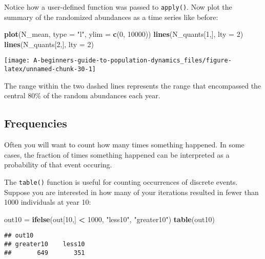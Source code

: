 \documentclass[]{book}
\newenvironment{Shaded}{\begin{snugshade}}{\end{snugshade}}
\newcommand{\DataTypeTok}[1]{\textcolor[rgb]{0.13,0.29,0.53}{#1}}
\newcommand{\DecValTok}[1]{\textcolor[rgb]{0.00,0.00,0.81}{#1}}
\newcommand{\KeywordTok}[1]{\textcolor[rgb]{0.13,0.29,0.53}{\textbf{#1}}}
\newcommand{\NormalTok}[1]{#1}
\newcommand{\OperatorTok}[1]{\textcolor[rgb]{0.81,0.36,0.00}{\textbf{#1}}}
\newcommand{\StringTok}[1]{\textcolor[rgb]{0.31,0.60,0.02}{#1}}
\begin{document}
Notice how a user-defined function was passed to \texttt{apply()}. Now plot the summary of the randomized abundances as a time series like before:

\begin{Shaded}
\begin{Highlighting}[]
\KeywordTok{plot}\NormalTok{(N_mean, }\DataTypeTok{type =} \StringTok{"l"}\NormalTok{, }\DataTypeTok{ylim =} \KeywordTok{c}\NormalTok{(}\DecValTok{0}\NormalTok{, }\DecValTok{10000}\NormalTok{))}
\KeywordTok{lines}\NormalTok{(N_quants[}\DecValTok{1}\NormalTok{,], }\DataTypeTok{lty =} \DecValTok{2}\NormalTok{)}
\KeywordTok{lines}\NormalTok{(N_quants[}\DecValTok{2}\NormalTok{,], }\DataTypeTok{lty =} \DecValTok{2}\NormalTok{)}
\end{Highlighting}
\end{Shaded}

\begin{center}\texttt{[image: A-beginners-guide-to-population-dynamics\_files/figure-latex/unnamed-chunk-30-1]} \end{center}

The range within the two dashed lines represents the range that encompassed the central 80\% of the random abundances each year.

\hypertarget{frequencies}{%
\subsection{Frequencies}\label{frequencies}}

Often you will want to count how many times something happened. In some cases, the fraction of times something happened can be interpreted as a probability of that event occuring.

The \texttt{table()} function is useful for counting occurrences of discrete events. Suppose you are interested in how many of your iterations resulted in fewer than 1000 individuals at year 10:

\begin{Shaded}
\begin{Highlighting}[]
\NormalTok{out10 =}\StringTok{ }\KeywordTok{ifelse}\NormalTok{(out[}\DecValTok{10}\NormalTok{,] }\OperatorTok{<}\StringTok{ }\DecValTok{1000}\NormalTok{, }\StringTok{"less10"}\NormalTok{, }\StringTok{"greater10"}\NormalTok{)}
\KeywordTok{table}\NormalTok{(out10)}
\end{Highlighting}
\end{Shaded}

\begin{verbatim}
## out10
## greater10    less10 
##       649       351
\end{verbatim}
\end{document}
